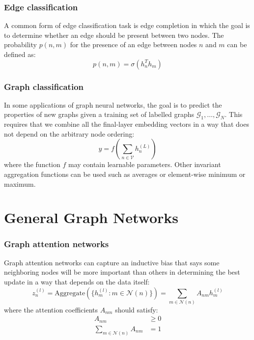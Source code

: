 \documentclass{beamer}
\begin{document}
\begin{frame}
    \frametitle{Edge classification}
    A common form of edge classification task is edge completion in which the goal is to determine whether an edge should be present between two nodes. The probability $p(n,m)$ for the presence of an edge between nodes $n$ and $m$ can be defined as:
    \begin{equation*}
        p(n,m)=\sigma(h_{n}^{T}h_{m})
    \end{equation*}
\end{frame}

\begin{frame}
    \frametitle{Graph classification}
    In some applications of graph neural networks, the goal is to predict the properties of new graphs given a training set of labelled graphs $\mathcal{G}_{1},\hdots,\mathcal{G}_{N}$. This requires that we combine all the final-layer embedding vectors in a way that does not depend on the arbitrary node ordering:
    \begin{equation*}
        y=f(\sum_{n\in\mathcal{V}}h^{(L)}_{n})
    \end{equation*}
    where the function $f$ may contain learnable parameters. Other invariant aggregation functions can be used such as averages or element-wise minimum or maximum.
\end{frame}

\section{General Graph Networks}

\begin{frame}
    \frametitle{Graph attention networks}
    Graph attention networks can capture an inductive bias that says some neighboring nodes will be more important than others in determining the best update in a way that depends on the data itself:
    \begin{equation*}
        z^{(l)}_{n}=\mathrm{Aggregate}(\{h^{(l)}_{m}:m\in\mathcal{N}(n)\})=\sum_{m\in\mathcal{N}(n)}A_{nm}h^{(l)}_{m}
    \end{equation*}
    where the attention coefficients $A_{nm}$ should satisfy:
    \begin{align*}
        A_{nm}&\ge{}0 \\
        \sum_{m\in\mathcal{N}(n)}A_{nm}&=1
    \end{align*}
\end{frame}
\end{document}
